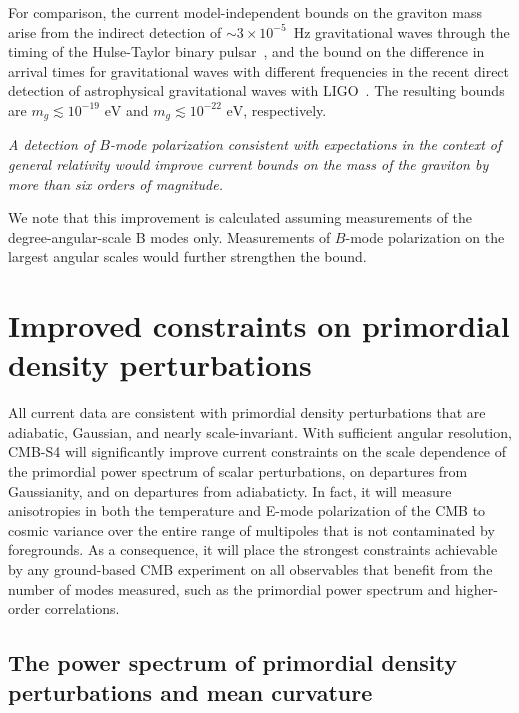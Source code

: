 For comparison, the current model-independent bounds on the graviton mass arise from the indirect detection of $\sim 3\times 10^{-5}$~Hz gravitational waves through the timing of the Hulse-Taylor binary pulsar~\cite{Finn:2001qi}, and the bound on the difference in arrival times for gravitational waves with different frequencies in the recent direct detection of astrophysical gravitational waves with LIGO~\cite{Abbott:2016blz}. The resulting bounds are $m_g\lesssim 10^{-19}{\mbox{ eV}}$ and $m_g\lesssim 10^{-22}{\mbox{ eV}}$, respectively. 

{\it A detection of $B$-mode polarization consistent with expectations in the context of general relativity would improve current bounds on the mass of the graviton by more than six orders of magnitude.} 

We note that this improvement is calculated assuming measurements of the degree-angular-scale B modes only. Measurements of $B$-mode polarization on the largest angular scales would further strengthen the bound. 



\section{Improved constraints on primordial density perturbations}
\label{sec:scalar}
All current data are consistent with primordial density perturbations that are adiabatic, Gaussian, and nearly scale-invariant. With sufficient angular resolution, CMB-S4 will significantly improve current constraints on the scale dependence of the primordial power spectrum of scalar perturbations, on departures from Gaussianity, and on departures from adiabaticty. In fact, it will measure anisotropies in both the temperature and E-mode polarization of the CMB to cosmic variance over the entire range of multipoles that is not contaminated by foregrounds. As a consequence, it will place the strongest constraints achievable by any ground-based CMB experiment on all observables that benefit from the number of modes measured, such as the primordial power spectrum and higher-order correlations.

\subsection{The power spectrum of primordial density perturbations and mean curvature}

